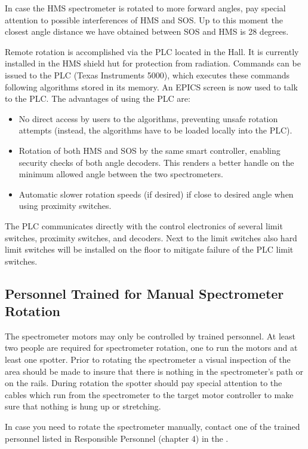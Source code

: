 {In case the HMS spectrometer is rotated to more forward angles, pay special
attention to possible interferences of HMS and SOS. Up to this moment
the closest  angle distance we have obtained between SOS and HMS is 28 degrees.

Remote rotation  is accomplished via the PLC located in the Hall.  It
is currently installed in the HMS shield hut for protection from
radiation.  Commands can be issued to the PLC (Texas Instruments 5000), which executes these commands
following algorithms stored in its memory. An EPICS screen is now
used to talk to the PLC.  The advantages of using the PLC are:

\begin{itemize}
\item{No direct access by users to the algorithms, preventing unsafe
rotation attempts (instead, the algorithms have to be loaded locally into
the PLC).}
\item{Rotation of both HMS and SOS by the same smart controller, enabling
security checks of both angle decoders. This renders a better handle on the
minimum allowed angle between the two spectrometers.}
\item{Automatic slower rotation speeds (if desired) if close to desired angle
when using proximity switches.}
\end{itemize}

The PLC communicates directly with the control electronics of several limit
switches, proximity switches, and decoders. Next to the limit switches
also hard limit switches will be installed on the floor to mitigate failure
of the PLC limit switches.


\subsection{Personnel Trained for Manual Spectrometer Rotation}

The spectrometer motors may only be controlled by trained personnel.
At least two people are required for spectrometer rotation, one to
run the motors and at least one spotter. Prior to rotating the spectrometer
a visual inspection of the area should be made to insure that there
is nothing in the spectrometer's path or on the rails. During rotation
the spotter should pay special attention to
the cables which run from the
spectrometer to the target motor controller to make sure that
nothing is hung up or stretching.

In case you need to rotate the spectrometer manually, contact one of the trained
personnel listed in Responsible Personnel (chapter 4) in
the .
}

